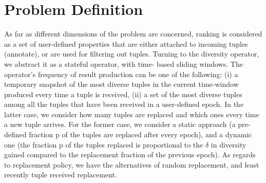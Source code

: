 \section{Problem Definition}
\indent As far as different dimensions of the problem are concerned, ranking is
considered as a set of user-defined properties that are either attached to
incoming tuples (annotate), or are used for filtering out tuples. Turning
to the diversity operator, we abstract it as a stateful operator, with time-
based sliding windows. The operator's frequency of result production
can be one of the following: (i) a temporary snapshot of the most diverse
tuples in the current time-window produced every time a tuple is received,
(ii) a set of the most diverse tuples among all the tuples that have been
received in a user-defined epoch. In the latter case, we consider how
many tuples are replaced and which ones every time a new tuple arrives.
For the former case, we consider a static approach (a pre-defined fraction
p of the tuples are replaced after every epoch), and a dynamic one (the
fraction p of the tuples replaced is proportional to the $\delta$ in diversity gained
compared to the replacement fraction of the previous epoch). As regards
to replacement policy, we have the alternatives of random replacement,
and least recently tuple received replacement.